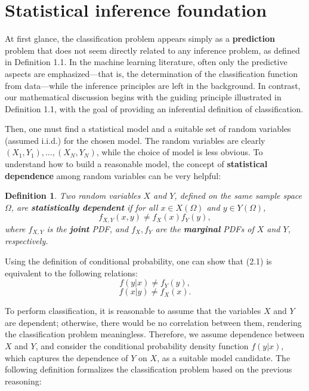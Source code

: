 \documentclass{report}
\newtheorem{definition}{Definition}[chapter]
\begin{document}
\section{Statistical inference foundation}
At first glance, the classification problem appears simply as a \textbf{prediction} problem that does not seem directly related to any inference problem, as defined in Definition 1.1. In the machine learning literature, often only the predictive aspects are emphasized—that is, the determination of the classification function from data—while the inference principles are left in the background. In contrast, our mathematical discussion begins with the guiding principle illustrated in Definition 1.1, with the goal of providing an inferential definition of classification.

Then, one must find a statistical model and a suitable set of random variables (assumed i.i.d.) for the chosen model. The random variables are clearly $(X_1,Y_1),\dots,(X_N,Y_N)$, while the choice of model is less obvious. To understand how to build a reasonable model, the concept of \textbf{statistical dependence} among random variables can be very helpful:

\begin{definition}
Two random variables $X$ and $Y$, defined on the same sample space $\Omega$, are \textbf{statistically dependent} if for all $x\in X(\Omega)$ and $y \in Y(\Omega)$,
\begin{equation}
f_{X,Y}(x,y) \neq f_X(x)f_Y(y),
\end{equation}
where $f_{X,Y}$ is the \textbf{joint} PDF, and $f_X,f_Y$ are the \textbf{marginal} PDFs of $X$ and $Y$, respectively.
\end{definition}

Using the definition of conditional probability, one can show that (2.1) is equivalent to the following relations:
\begin{equation}
f(y|x) \neq f_Y(y),
\end{equation}
\begin{equation}
f(x|y) \neq f_X(x).
\end{equation}

To perform classification, it is reasonable to assume that the variables $X$ and $Y$ are dependent; otherwise, there would be no correlation between them, rendering the classification problem meaningless. Therefore, we assume dependence between $X$ and $Y$, and consider the conditional probability density function $f(y|x)$, which captures the dependence of $Y$ on $X$, as a suitable model candidate. The following definition formalizes the classification problem based on the previous reasoning:
\end{document}
